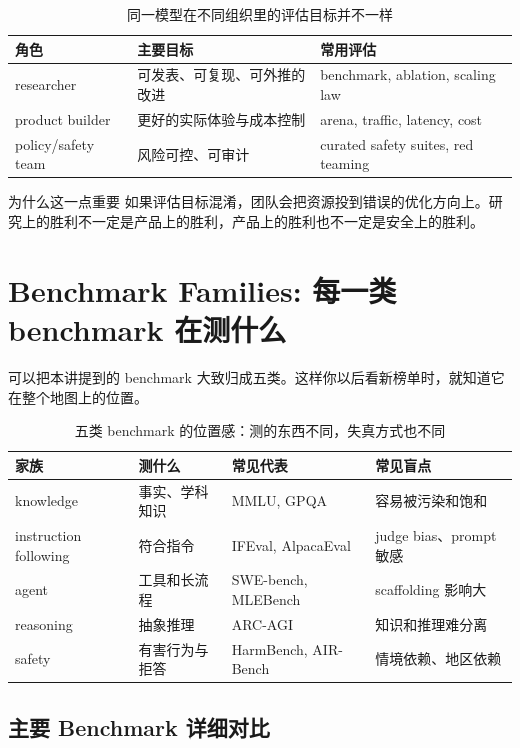 \documentclass[a4paper]{article}
\begin{document}
\begin{table}[H]
\centering
\begin{tabular}{p{3.0cm}p{4.3cm}p{5.4cm}}
\toprule
\textbf{角色} & \textbf{主要目标} & \textbf{常用评估} \\
\midrule
researcher & 可发表、可复现、可外推的改进 & benchmark, ablation, scaling law \\
product builder & 更好的实际体验与成本控制 & arena, traffic, latency, cost \\
policy/safety team & 风险可控、可审计 & curated safety suites, red teaming \\
\bottomrule
\end{tabular}
\caption{同一模型在不同组织里的评估目标并不一样}
\end{table}

\begin{knowledgebox}{为什么这一点重要}
如果评估目标混淆，团队会把资源投到错误的优化方向上。研究上的胜利不一定是产品上的胜利，产品上的胜利也不一定是安全上的胜利。
\end{knowledgebox}

\section{Benchmark Families: 每一类 benchmark 在测什么}

可以把本讲提到的 benchmark 大致归成五类。这样你以后看新榜单时，就知道它在整个地图上的位置。

\begin{table}[H]
\centering
\begin{tabular}{p{2.6cm}p{3.7cm}p{4.1cm}p{3.0cm}}
\toprule
\textbf{家族} & \textbf{测什么} & \textbf{常见代表} & \textbf{常见盲点} \\
\midrule
knowledge & 事实、学科知识 & MMLU, GPQA & 容易被污染和饱和 \\
instruction following & 符合指令 & IFEval, AlpacaEval & judge bias、prompt 敏感 \\
agent & 工具和长流程 & SWE-bench, MLEBench & scaffolding 影响大 \\
reasoning & 抽象推理 & ARC-AGI & 知识和推理难分离 \\
safety & 有害行为与拒答 & HarmBench, AIR-Bench & 情境依赖、地区依赖 \\
\bottomrule
\end{tabular}
\caption{五类 benchmark 的位置感：测的东西不同，失真方式也不同}
\end{table}

\subsection{主要 Benchmark 详细对比}
\end{document}
